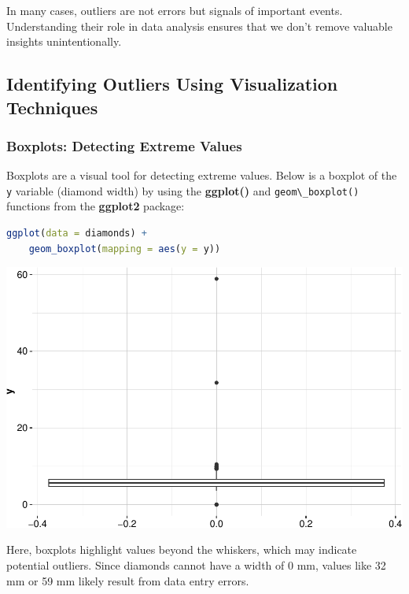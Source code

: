 \documentclass[
]{book}
\newcommand{\passthrough}[1]{#1}
\theoremstyle{definition}
\theoremstyle{definition}
\theoremstyle{definition}
\theoremstyle{definition}
\theoremstyle{remark}
\begin{document}
In many cases, outliers are not errors but signals of important events. Understanding their role in data analysis ensures that we don't remove valuable insights unintentionally.

\subsection*{Identifying Outliers Using Visualization Techniques}\label{identifying-outliers-using-visualization-techniques}

\subsubsection*{Boxplots: Detecting Extreme Values}\label{boxplots-detecting-extreme-values}

Boxplots are a visual tool for detecting extreme values. Below is a boxplot of the \passthrough{\lstinline!y!} variable (diamond width) by using the \textbf{ggplot()} and \passthrough{\lstinline!geom\_boxplot()!} functions from the \textbf{ggplot2} package:

\begin{lstlisting}[language=R]
ggplot(data = diamonds) +
    geom_boxplot(mapping = aes(y = y))
\end{lstlisting}

\begin{center}\includegraphics[width=0.7\linewidth]{data-preparation_files/figure-latex/unnamed-chunk-4-1} \end{center}

Here, boxplots highlight values beyond the whiskers, which may indicate potential outliers. Since diamonds cannot have a width of 0 mm, values like 32 mm or 59 mm likely result from data entry errors.
\end{document}
